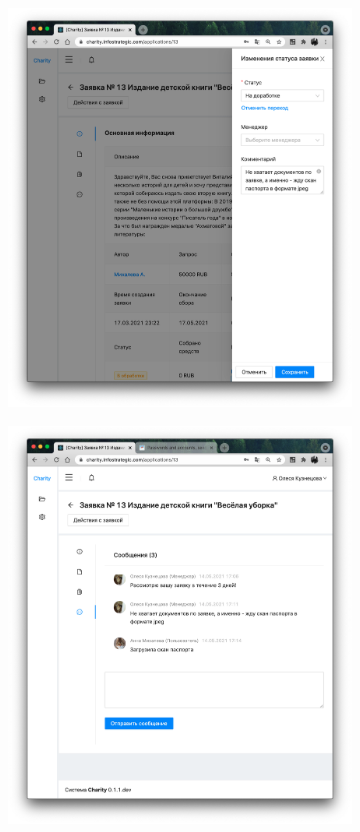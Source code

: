 \documentclass[a4paper,12pt,reqno]{article}
\begin{document}
\begin{figure}[H]
\begin{subfigure}[b]{0.475\linewidth}
		\end{subfigure}
		\begin{subfigure}[b]{0.475\linewidth}
			\includegraphics[width=\linewidth]{img/ro/application_drawer.png}
		\end{subfigure}
		\begin{subfigure}[b]{0.475\linewidth}
			\includegraphics[width=\linewidth]{img/ro/application_comments.png}

\end{subfigure}
\end{figure}
\end{document}
